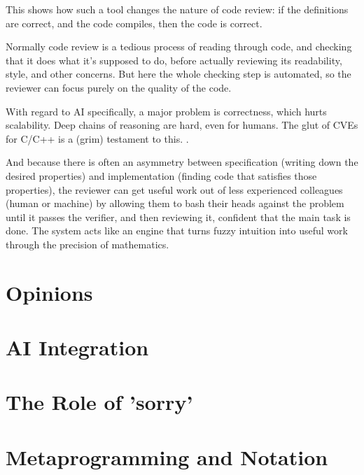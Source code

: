 \documentclass{article}
\begin{document}
This shows how such a tool changes the nature of code review: if the definitions are correct, and the code compiles, then the code is correct.

Normally code review is a tedious process of reading through code, and checking that it does what it's supposed to do, before actually reviewing its readability, style, and other concerns. But here the whole checking step is automated, so the reviewer can focus purely on the quality of the code.

With regard to AI specifically, a major problem is correctness, which hurts scalability. Deep chains of reasoning are hard, even for humans. The glut of CVEs for C/C++ is a (grim) testament to this. .



And because there is often an asymmetry between specification (writing down the desired properties) and implementation (finding code that satisfies those properties), the reviewer can get useful work out of less experienced colleagues (human or machine) by allowing them to bash their heads against the problem until it passes the verifier, and then reviewing it, confident that the main task is done. The system acts like an engine that turns fuzzy intuition into useful work through the precision of mathematics.

\section{Opinions}


\section{AI Integration}

\section{The Role of 'sorry'}

\section{Metaprogramming and Notation}
\end{document}
